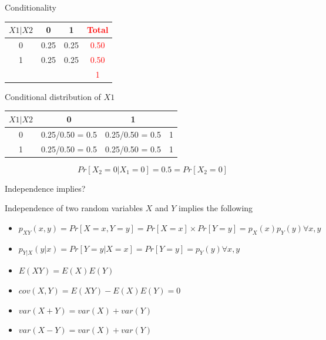 \documentclass{beamer}\usepackage[]{graphicx}\usepackage[]{color}
\begin{document}
\begin{frame}[fragile]{Conditionality \;\;}

\begin{tabular}{|c|c|c|c|}
\hline
$X1|X2$ & 0 & 1  & \textcolor{red}{Total}\\ \hline 
0 &  0.25 &  0.25  & \textcolor{red}{0.50}\\ \hline
1 &  0.25 &  0.25  & \textcolor{red}{0.50}\\ \hline
 & & & \textcolor{red}{1} \\ \hline
\end{tabular} \pause \newline


Conditional distribution of $X1$
\begin{tabular}{|c|c|c|c|}
\hline
$X1|X2$ & 0 & 1  & \\ \hline 
0 &  0.25/0.50 = 0.5 &  0.25/0.50 = 0.5 & 1\\ \hline
1 &  0.25/0.50 = 0.5 &  0.25/0.50 = 0.5  & 1\\ \hline
\end{tabular} \pause \newline 

$$ Pr[X_2 = 0 | X_1 = 0] = 0.5 = Pr [X_2 = 0] $$

\end{frame}

\begin{frame}[fragile]{Independence implies? \;\;}

Independence of two random variables $X$ and $Y$ implies the following

\begin{itemize}
\item $p_{XY}(x,y) = Pr [ X=x, Y=y] = Pr [X=x] \times Pr [Y=y] = p_{X}(x) p_{Y}(y) \forall x, y $ \pause \newline
\item $p_{Y|X}(y|x) = Pr [ Y=y | X=x ] = Pr [Y=y] = p_{Y}(y)  \forall x, y $ \pause  \newline
\item $ E(XY) = E(X)E(Y) $  \pause \newline
\item $ cov(X,Y) = E(XY) - E(X)E(Y) = 0 $  \pause \newline
\item $ var (X + Y) = var(X) + var(Y) $  \pause \newline
\item $ var (X - Y) = var(X) + var(Y) $ \pause \newline
\end{itemize}

\end{frame}
\end{document}
